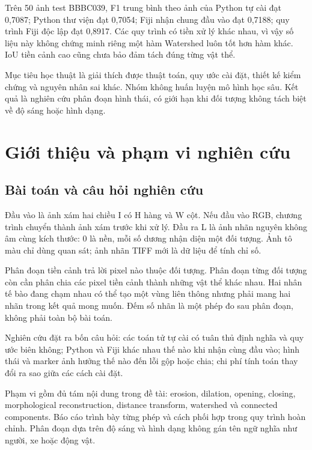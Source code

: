 \documentclass[12pt,a4paper,oneside]{report}
\begin{document}
Trên 50 ảnh test BBBC039, F1 trung bình theo ảnh của Python tự cài đạt 0,7087; Python thư viện đạt 0,7054; Fiji nhận chung đầu vào đạt 0,7188; quy trình Fiji độc lập đạt 0,8917. Các quy trình có tiền xử lý khác nhau, vì vậy số liệu này không chứng minh riêng một hàm Watershed luôn tốt hơn hàm khác. IoU tiền cảnh cao cũng chưa bảo đảm tách đúng từng vật thể.

Mục tiêu học thuật là giải thích được thuật toán, quy ước cài đặt, thiết kế kiểm chứng và nguyên nhân sai khác. Nhóm không huấn luyện mô hình học sâu. Kết quả là nghiên cứu phân đoạn hình thái, có giới hạn khi đối tượng không tách biệt về độ sáng hoặc hình dạng.


\clearpage\tableofcontents\clearpage\listoffigures\clearpage\listoftables\clearpage{}
\chapter{Giới thiệu và phạm vi nghiên cứu}\label{chap:intro}

\section{Bài toán và câu hỏi nghiên cứu}
Đầu vào là ảnh xám hai chiều I có H hàng và W cột. Nếu đầu vào RGB, chương trình chuyển thành ảnh xám trước khi xử lý. Đầu ra L là ảnh nhãn nguyên không âm cùng kích thước: 0 là nền, mỗi số dương nhận diện một đối tượng. Ảnh tô màu chỉ dùng quan sát; ảnh nhãn TIFF mới là dữ liệu để tính chỉ số.

Phân đoạn tiền cảnh trả lời pixel nào thuộc đối tượng. Phân đoạn từng đối tượng còn cần phân chia các pixel tiền cảnh thành những vật thể khác nhau. Hai nhân tế bào đang chạm nhau có thể tạo một vùng liên thông nhưng phải mang hai nhãn trong kết quả mong muốn. Đếm số nhãn là một phép đo sau phân đoạn, không phải toàn bộ bài toán.

Nghiên cứu đặt ra bốn câu hỏi: các toán tử tự cài có tuân thủ định nghĩa và quy ước biên không; Python và Fiji khác nhau thế nào khi nhận cùng đầu vào; hình thái và marker ảnh hưởng thế nào đến lỗi gộp hoặc chia; chi phí tính toán thay đổi ra sao giữa các cách cài đặt.

Phạm vi gồm đủ tám nội dung trong đề tài: erosion, dilation, opening, closing, morphological reconstruction, distance transform, watershed và connected components. Báo cáo trình bày từng phép và cách phối hợp trong quy trình hoàn chỉnh. Phân đoạn dựa trên độ sáng và hình dạng không gán tên ngữ nghĩa như người, xe hoặc động vật.
\end{document}
